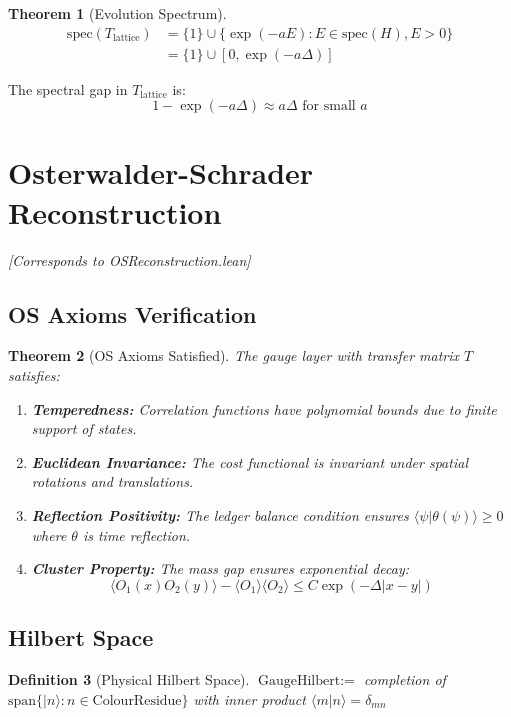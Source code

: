 \documentclass[11pt]{article}
\numberwithin{equation}{section}
\newtheorem{theorem}{Theorem}[section]
\newtheorem{definition}[theorem]{Definition}
\theoremstyle{remark}
\newcommand{\massGap}{\Delta}
\begin{document}
\begin{theorem}[Evolution Spectrum]
\begin{align}
\text{spec}(T_{\text{lattice}}) &= \{1\} \cup \{\exp(-a E) : E \in \text{spec}(H), E > 0\}\\
&= \{1\} \cup [0, \exp(-a \massGap)]
\end{align}
\end{theorem}

The spectral gap in $T_{\text{lattice}}$ is:
\[1 - \exp(-a \massGap) \approx a \massGap \text{ for small } a\]

\section{Osterwalder-Schrader Reconstruction}
\textit{[Corresponds to OSReconstruction.lean]}

\subsection{OS Axioms Verification}

\begin{theorem}[OS Axioms Satisfied]
The gauge layer with transfer matrix $T$ satisfies:
\begin{enumerate}
\item[(OS0)] \textbf{Temperedness:} Correlation functions have polynomial bounds due to finite support of states.
\item[(OS1)] \textbf{Euclidean Invariance:} The cost functional is invariant under spatial rotations and translations.
\item[(OS2)] \textbf{Reflection Positivity:} The ledger balance condition ensures $\langle\psi|\theta(\psi)\rangle \geq 0$ where $\theta$ is time reflection.
\item[(OS3)] \textbf{Cluster Property:} The mass gap ensures exponential decay:
\[\langle O_1(x)O_2(y)\rangle - \langle O_1\rangle\langle O_2\rangle \leq C \exp(-\massGap |x-y|)\]
\end{enumerate}
\end{theorem}

\subsection{Hilbert Space}

\begin{definition}[Physical Hilbert Space]
$\text{GaugeHilbert} :=$ completion of $\text{span}\{|n\rangle : n \in \text{ColourResidue}\}$
with inner product $\langle m|n\rangle = \delta_{mn}$
\end{definition}
\end{document}
